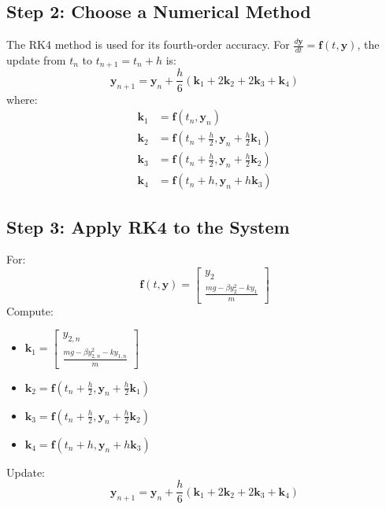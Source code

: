 \documentclass[a4paper,12pt]{article}
\begin{document}
\subsection*{Step 2: Choose a Numerical Method}
The RK4 method is used for its fourth-order accuracy. For \(\frac{d\mathbf{y}}{dt} = \mathbf{f}(t, \mathbf{y})\), the update from \(t_n\) to \(t_{n+1} = t_n + h\) is:
\begin{equation}
\mathbf{y}_{n+1} = \mathbf{y}_n + \frac{h}{6} ( \mathbf{k}_1 + 2 \mathbf{k}_2 + 2 \mathbf{k}_3 + \mathbf{k}_4 )
\end{equation}
where:
\begin{align}
\mathbf{k}_1 &= \mathbf{f}(t_n, \mathbf{y}_n) \\
\mathbf{k}_2 &= \mathbf{f}\left(t_n + \frac{h}{2}, \mathbf{y}_n + \frac{h}{2} \mathbf{k}_1\right) \\
\mathbf{k}_3 &= \mathbf{f}\left(t_n + \frac{h}{2}, \mathbf{y}_n + \frac{h}{2} \mathbf{k}_2\right) \\
\mathbf{k}_4 &= \mathbf{f}(t_n + h, \mathbf{y}_n + h \mathbf{k}_3)
\end{align}

\subsection*{Step 3: Apply RK4 to the System}
For:
\[
\mathbf{f}(t, \mathbf{y}) = \begin{bmatrix} y_2 \\ \frac{mg - \beta y_2^2 - k y_1}{m} \end{bmatrix}
\]
Compute:
\begin{itemize}
    \item \(\mathbf{k}_1 = \begin{bmatrix} y_{2,n} \\ \frac{mg - \beta y_{2,n}^2 - k y_{1,n}}{m} \end{bmatrix}\)
    \item \(\mathbf{k}_2 = \mathbf{f}\left(t_n + \frac{h}{2}, \mathbf{y}_n + \frac{h}{2} \mathbf{k}_1\right)\)
    \item \(\mathbf{k}_3 = \mathbf{f}\left(t_n + \frac{h}{2}, \mathbf{y}_n + \frac{h}{2} \mathbf{k}_2\right)\)
    \item \(\mathbf{k}_4 = \mathbf{f}(t_n + h, \mathbf{y}_n + h \mathbf{k}_3)\)
\end{itemize}
Update:
\[
\mathbf{y}_{n+1} = \mathbf{y}_n + \frac{h}{6} ( \mathbf{k}_1 + 2 \mathbf{k}_2 + 2 \mathbf{k}_3 + \mathbf{k}_4 )
\]
\end{document}

